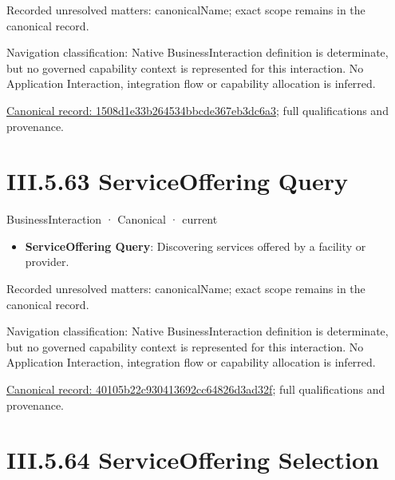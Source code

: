 {\small Recorded unresolved matters: canonicalName; exact scope remains in the canonical record.}\par
{\small Navigation classification: Native BusinessInteraction definition is determinate, but no governed capability context is represented for this interaction. No Application Interaction, integration flow or capability allocation is inferred.}\par
{\footnotesize \href{../../../../continuum/business/business-interaction/1508d1e33b264534bbcde367eb3dc6a3.md}{Canonical record: 1508d1e33b264534bbcde367eb3dc6a3}; full qualifications and provenance.}\par
\section*{III.5.63 ServiceOffering Query}
\label{navigation:III.5.63}

\label{element:40105b22c930413692cc64826d3ad32f}
{\small BusinessInteraction · Canonical · current}\par

\begin{itemize}


\item \textbf{ServiceOffering Query}: Discovering services offered by a facility or provider.

\end{itemize}

{\small Recorded unresolved matters: canonicalName; exact scope remains in the canonical record.}\par
{\small Navigation classification: Native BusinessInteraction definition is determinate, but no governed capability context is represented for this interaction. No Application Interaction, integration flow or capability allocation is inferred.}\par
{\footnotesize \href{../../../../continuum/business/business-interaction/40105b22c930413692cc64826d3ad32f.md}{Canonical record: 40105b22c930413692cc64826d3ad32f}; full qualifications and provenance.}\par
\section*{III.5.64 ServiceOffering Selection}
\label{navigation:III.5.64}

